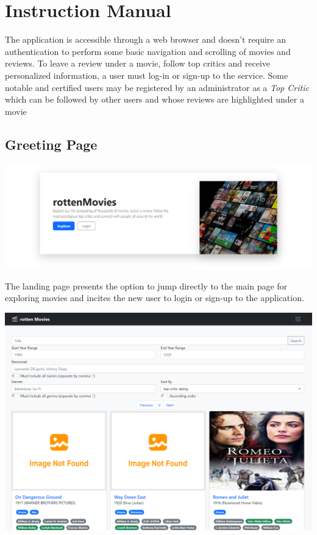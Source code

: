 


\chapter{Instruction Manual}

The application is accessible through a web browser and doesn't require an authentication to perform some basic navigation and scrolling of movies and reviews. To leave a review under a movie, follow top critics and receive personalized information, a user must log-in or sign-up to the service. Some notable and certified users may be registered by an administrator as a \textit{Top Critic} which can be followed by other users and whose reviews are highlighted under a movie

\section{Greeting Page}

\begin{flushleft}
\includegraphics[scale=0.45]{../../../images/user_manual/index.png} 
\end{flushleft}

The landing page presents the option to jump directly to the main page for exploring movies and incites the new user to login or sign-up to the application.

\includegraphics[scale=0.45]{../../../images/user_manual/search.png} 

